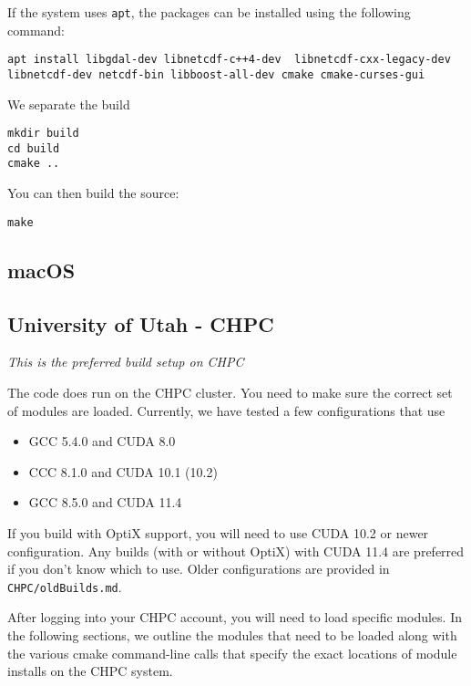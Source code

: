If the system uses \verb|apt|, the packages can be installed using the following command:
\begin{verbatim}
apt install libgdal-dev libnetcdf-c++4-dev  libnetcdf-cxx-legacy-dev libnetcdf-dev netcdf-bin libboost-all-dev cmake cmake-curses-gui
\end{verbatim}


We separate the build 
\begin{verbatim}
mkdir build
cd build
cmake ..
\end{verbatim}
You can then build the source:
\begin{verbatim}
make
\end{verbatim}

\subsection{macOS}


\subsection{University of Utah - CHPC}

\textit{This is the preferred build setup on CHPC}

The code does run on the CHPC cluster. You need to make sure the correct set of modules are loaded.  Currently, we have tested a few configurations that use
\begin{itemize}
\item GCC 5.4.0 and CUDA 8.0
\item CCC 8.1.0 and CUDA 10.1 (10.2)
\item GCC 8.5.0 and CUDA 11.4
\end{itemize}
If you build with OptiX support, you will need to use CUDA 10.2 or newer configuration. Any builds (with or without OptiX) with CUDA 11.4 are preferred if you don't know which to use. Older configurations are provided in \verb|CHPC/oldBuilds.md|.

After logging into your CHPC account, you will need to load specific modules. In the following sections, we outline the modules that need to be loaded along with the various cmake command-line calls that specify the exact locations of module installs on the CHPC system.  

